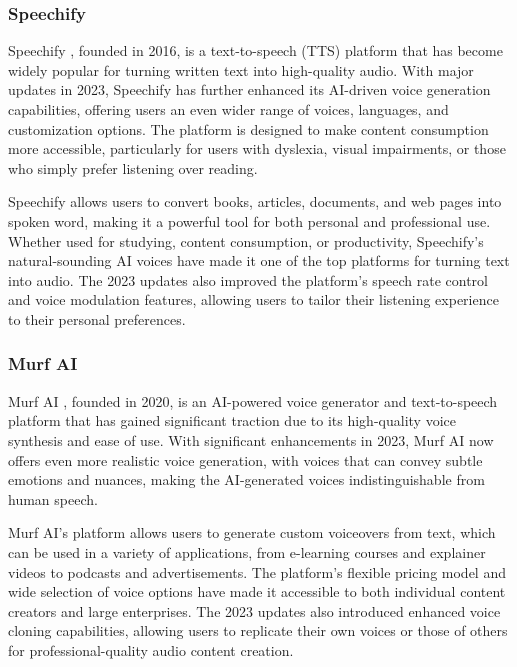\subsubsection{Speechify}

Speechify \cite{chukwuemeka2024artificial}, founded in 2016, is a text-to-speech (TTS) platform that has become widely popular for turning written text into high-quality audio. 
With major updates in 2023, Speechify has further enhanced its AI-driven voice generation capabilities, offering users an even wider range of voices, languages, and customization options. 
The platform is designed to make content consumption more accessible, particularly for users with dyslexia, visual impairments, or those who simply prefer listening over reading.

Speechify allows users to convert books, articles, documents, and web pages into spoken word, making it a powerful tool for both personal and professional use. 
Whether used for studying, content consumption, or productivity, Speechify’s natural-sounding AI voices have made it one of the top platforms for turning text into audio. 
The 2023 updates also improved the platform’s speech rate control and voice modulation features, allowing users to tailor their listening experience to their personal preferences.

\subsubsection{Murf AI}

Murf AI \cite{mohammadkarimi2024exploring}, founded in 2020, is an AI-powered voice generator and text-to-speech platform that has gained significant traction due to its high-quality voice synthesis and ease of use. 
With significant enhancements in 2023, Murf AI now offers even more realistic voice generation, with voices that can convey subtle emotions and nuances, making the AI-generated voices indistinguishable from human speech.

Murf AI’s platform allows users to generate custom voiceovers from text, which can be used in a variety of applications, from e-learning courses and explainer videos to podcasts and advertisements. 
The platform’s flexible pricing model and wide selection of voice options have made it accessible to both individual content creators and large enterprises. 
The 2023 updates also introduced enhanced voice cloning capabilities, allowing users to replicate their own voices or those of others for professional-quality audio content creation.

